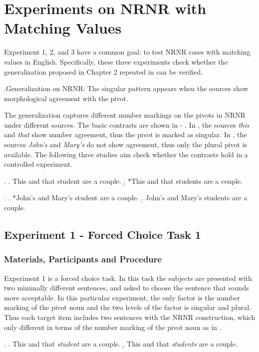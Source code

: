 \documentclass[
  11pt          %
  ,letterpaper  %
  ,center       %
  ,noupper      %
  ]{uconnthesis2}
\begin{document}
\section{Experiments on NRNR with Matching Values}

Experiment 1, 2, and 3 have a common goal: to test NRNR cases with matching values in English. Specifically, these three experiments check whether the generalization proposed in Chapter 2 repeated in \Next can be verified.

\ex.\label{ch3:gen}Generalization on NRNR: The singular pattern appears when the sources show morphological agreement with the pivot.

The generalization captures different number markings on the pivots in NRNR under different sources. The basic contrasts are shown in \Next - \NNext. In \Next, the sources \textit{this} and \textit{that} show number agreement, thus the pivot is marked as singular. In \NNext, the sources \textit{John's} and \textit{Mary's} do not show agreement, thus only the plural pivot is available. The following three studies aim check whether the contrasts hold in a controlled experiment.

\ex. 
\a. This and that student are a couple.
\b. *This and that students are a couple.

\ex.
\a. *John's and Mary's student are a couple.
\b. John's and Mary's students are a couple.

\subsection{Experiment 1 - Forced Choice Task 1}

\subsubsection{Materials, Participants and Procedure}

Experiment 1 is a forced choice task. In this task the subjects are presented with two minimally different sentences, and asked to choose the sentence that sounds more acceptable. In this particular experiment, the only factor is the number marking of the pivot noun and the two levels of the factor is singular and plural. Thus each target item includes two sentences with the NRNR construction, which only different in terms of the number marking of the pivot noun as in \Next. 

\ex. \a. This and that \textit{student} are a couple.
\b. This and that \textit{students} are a couple.
\end{document}
